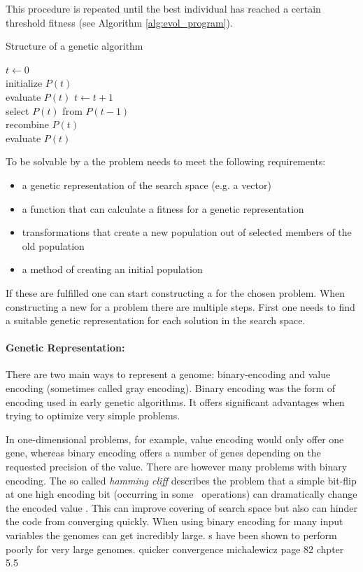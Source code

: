This procedure is repeated until the best individual has reached a certain threshold fitness (see Algorithm \ref{alg:evol_program}). 



\begin{algorithm}
\label{alg:evol_program}
\caption{Structure of a genetic algorithm}
\begin{algorithmic}
\STATE $t \gets 0$\\
initialize $P(t)$\\
evaluate $P(t)$
\STATE $t \gets t+1$\\
select $P(t)$ from $P(t-1)$\\
recombine $P(t)$\\
evaluate $P(t)$
\ENDWHILE
\end{algorithmic}
\end{algorithm}

To be solvable by a \ga the problem needs to meet the following requirements:
\begin{itemize}
\item a genetic representation of the search space (e.g. a vector)
\item a function that can calculate a fitness for a genetic representation
\item transformations that create a new population out of selected members of the old population
\item a method of creating an initial population
\end{itemize}


If these are fulfilled one can start constructing a \ga for the chosen problem. When constructing a new \ga for a problem there are multiple steps. First one needs to find a suitable genetic representation for each solution in the search space. 

\paragraph{Genetic Representation:}
There are two main ways to represent a genome: binary-encoding and value encoding (sometimes called gray encoding). Binary encoding was the form of encoding  used in early genetic algorithms. It offers significant advantages when trying to optimize very simple problems. 

In one-dimensional problems, for example, value encoding would only offer one gene, whereas binary encoding offers a number of genes depending on the requested precision of the value. 
There are however many problems with binary encoding. The so called \textit{hamming cliff} describes the problem that a simple bit-flip at one high encoding bit (occurring in some \ga\ operations) can dramatically change the encoded value \citet[e.g.][]{Chakraborty2003253}. This can improve covering of search space but also can hinder the code from converging quickly. When using binary encoding for many input variables the genomes can get incredibly large. \ga s have been shown to perform poorly for very large genomes. quicker convergence michalewicz page 82 chpter 5.5 

